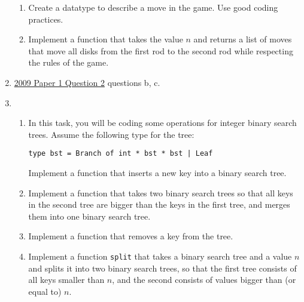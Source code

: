 \documentclass[11pt,a4paper]{article}
\begin{document}
\begin{enumerate}
\begin{enumerate}
    \item Create a datatype to describe a move in the game. Use good coding practices.

    \item Implement a function that takes the value $n$ and returns a list of moves that move all disks from the first rod to 
    the second rod while respecting the rules of the game. 
\end{enumerate}

\item
\href{https://www.cl.cam.ac.uk/teaching/exams/pastpapers/y2009p1q2.pdf}{2009 Paper 1 Question 2} questions b, c.

\item
\begin{enumerate}
    \item In this task, you will be coding some operations for integer binary search trees.  
    Assume the following type for the tree:  
    \begin{verbatim}
type bst = Branch of int * bst * bst | Leaf
    \end{verbatim}
    Implement a function that inserts a new key into a binary search tree.

    \item Implement a function that takes two binary search trees so that all keys in the second tree are bigger than the keys in the first tree, and merges them 
    into one binary search tree.

    \item Implement a function that removes a key from the tree.

    \item Implement a function \verb|split| that takes a binary search tree and a value $n$ 
    and splits it into two binary search trees, so that the first tree consists of all keys smaller than $n$, 
    and the second consists of values bigger than (or equal to) $n$.
\end{enumerate}

\end{enumerate}
\end{document}
